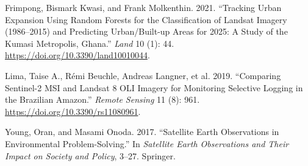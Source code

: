 \documentclass[
  letterpaper,
]{scrbook}
\newlength{\cslhangindent}
\newenvironment{CSLReferences}[2] %
 {\begin{list}{}{%
  \setlength{\itemindent}{0pt}
  \setlength{\leftmargin}{0pt}
  \setlength{\parsep}{0pt}
  \ifodd #1
   \setlength{\leftmargin}{\cslhangindent}
   \setlength{\itemindent}{-1\cslhangindent}
  \fi
  \setlength{\itemsep}{#2\baselineskip}}}
 {\end{list}}
\begin{document}
\label{refs}
\begin{CSLReferences}{1}{0}
Frimpong, Bismark Kwasi, and Frank Molkenthin. 2021. {``Tracking Urban
Expansion Using Random Forests for the Classification of Landsat Imagery
(1986--2015) and Predicting Urban/Built-up Areas for 2025: A Study of
the Kumasi Metropolis, Ghana.''} \emph{Land} 10 (1): 44.
\url{https://doi.org/10.3390/land10010044}.

Lima, Taise A., Rémi Beuchle, Andreas Langner, et al. 2019. {``Comparing
Sentinel-2 MSI and Landsat 8 OLI Imagery for Monitoring Selective
Logging in the Brazilian Amazon.''} \emph{Remote Sensing} 11 (8): 961.
\url{https://doi.org/10.3390/rs11080961}.

Young, Oran, and Masami Onoda. 2017. {``Satellite Earth Observations in
Environmental Problem-Solving.''} In \emph{Satellite Earth Observations
and Their Impact on Society and Policy}, 3--27. Springer.

\end{CSLReferences}


\backmatter
\end{document}

